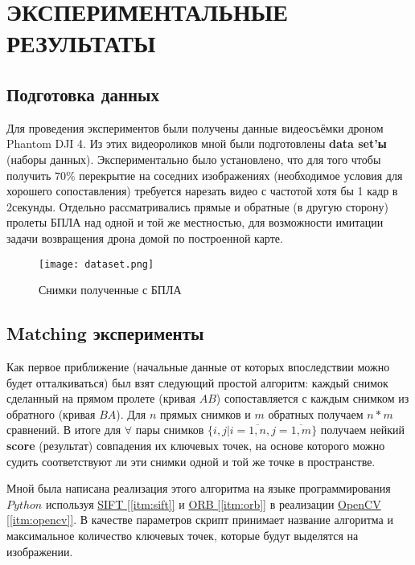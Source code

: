 \chapter{ЭКСПЕРИМЕНТАЛЬНЫЕ РЕЗУЛЬТАТЫ}

\section{Подготовка данных}

Для проведения экспериментов были получены данные видеосъёмки дроном Phantom DJI 4. Из этих видеороликов мной были подготовлены \textbf{data set'ы} (наборы данных). Экспериментально было установлено, что для того чтобы получить $70\%$ перекрытие на соседних изображениях (необходимое условия для хорошего сопоставления) требуется нарезать видео с частотой хотя бы 1 кадр в 2секунды. Отдельно рассматривались прямые и обратные (в другую сторону) пролеты БПЛА над одной и той же местностью, для возможности имитации задачи возвращения дрона домой по построенной карте.

\begin{figure}[h]
    \centering
    \texttt{[image: dataset.png]}
    \caption{Снимки полученные с БПЛА}
    \label{fig:dataset}
\end{figure}

\section{Matching эксперименты}

Как первое приближение (начальные данные от которых впоследствии можно будет отталкиваться) был взят следующий простой алгоритм: каждый снимок сделанный на прямом пролете (кривая $AB$) сопоставляется с каждым снимком из обратного (кривая $BA$). Для $n$ прямых снимков и $m$ обратных получаем $n*m$ сравнений. В итоге для $\forall$ пары снимков $\{i, j | i=\overline{1,n}, j=\overline{1,m}\}$ получаем нейкий \textbf{score} (результат) совпадения их ключевых точек, на основе которого можно судить соответствуют ли эти снимки одной и той же точке в пространстве.

Мной была написана реализация этого алгоритма на языке программирования $Python$ используя \hyperref[itm:sift]{SIFT [\ref{itm:sift}]} и \hyperref[itm:orb]{ORB [\ref{itm:orb}]} в реализации \hyperref[itm:opencv]{OpenCV [\ref{itm:opencv}]}. В качестве параметров скрипт принимает название алгоритма и максимальное количество ключевых точек, которые будут выделятся на изображении.


